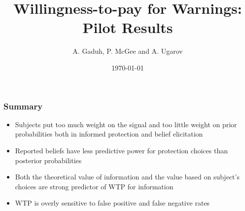 \documentclass[11pt,hyperref={bookmarks=false}]{beamer}
\title[Willingness-to-pay for Warnings]{Willingness-to-pay for Warnings: Pilot Results}
\author[A. Gaduh, P. McGee and A. Ugarov]{A. Gaduh, P. McGee and A. Ugarov}
\institute[]{}
\date{\today}
\begin{document}

\begin{frame}
\frametitle{Summary}
\begin{itemize}
\item Subjects put too much weight on the signal and too little weight on prior probabilities both in informed protection and belief elicitation
\item Reported beliefs have less predictive power for protection choices than posterior probabilities
\item Both the theoretical value of information and the value based on subject's choices are strong predictor of WTP for information
\item WTP is overly sensitive to false positive and false negative rates
\end{itemize}
\end{frame}
\end{document}
